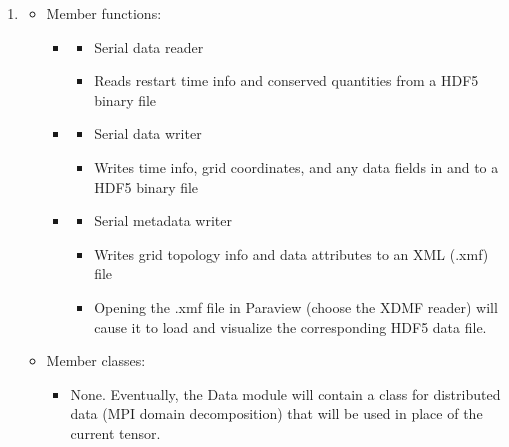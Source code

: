 \documentclass[letterpaper,10pt]{article}
\begin{document}
\begin{enumerate}
\item {}
  \vspace{-2mm}\begin{itemize}
  \item \textcolor{lc2}{Member functions:}
    \begin{itemize}
    \item {}
      \begin{itemize}
      \item Serial data reader
      \item Reads restart time info and conserved quantities from a HDF5 binary file
      \end{itemize}
      
    \item {}
      \begin{itemize}
      \item Serial data writer
      \item Writes time info, grid coordinates, and any data fields in  and  to a HDF5 binary file
      \end{itemize}
      
    \item {}
      \begin{itemize}
      \item Serial metadata writer
      \item Writes grid topology info and data attributes to an XML (.xmf) file
      \item Opening the .xmf file in Paraview (choose the XDMF reader) will cause it to load and visualize the corresponding HDF5 data file.
      \end{itemize}

    \end{itemize}

  \item \textcolor{lc2}{Member classes:}
    \begin{itemize}
    \item None. Eventually, the Data module will contain a class for distributed data (MPI domain decomposition) that will be used in place of the current  tensor.
    \end{itemize}
  \end{itemize}


\end{enumerate}
\end{document}
